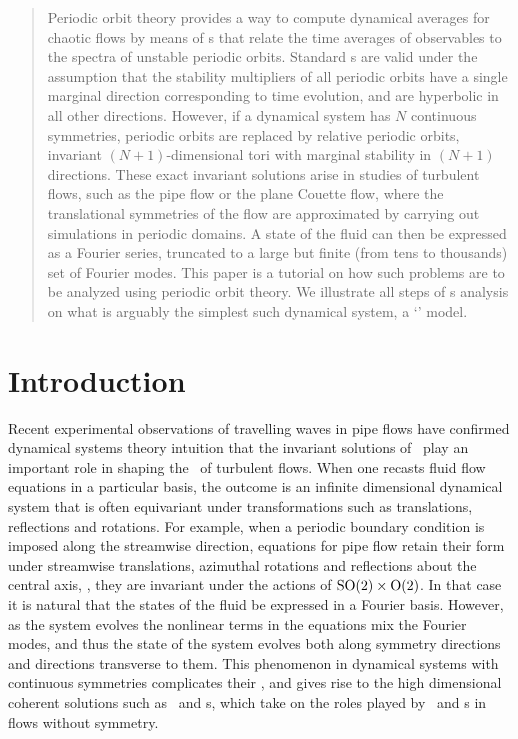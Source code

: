 \documentclass[aip,cha,
reprint,
secnumarabic,
nofootinbib, tightenlines,
nobibnotes, showkeys, showpacs,
superscriptaddress,
]{revtex4-1}
\begin{document}
\begin{quotation}
Periodic orbit theory provides a way to compute dynamical averages for
chaotic flows by means of {\cycForm s} that relate the time averages of
observables to the spectra of unstable periodic orbits. Standard
{\cycForm s} are valid under the assumption that the stability
multipliers of all periodic orbits have a single marginal direction
corresponding to time evolution, and are hyperbolic in all other
directions. However, if a dynamical system has $N$ continuous symmetries,
periodic orbits are replaced by relative periodic orbits, invariant
$(N+1)$-dimensional tori with marginal stability in $(N+1)$ directions.
These exact invariant solutions arise in studies of turbulent flows, such
as the pipe flow or the plane Couette flow, where the translational
symmetries of the flow are approximated by carrying out simulations in
periodic domains. A state of the fluid can then be expressed as a Fourier
series, truncated to a large but finite (from tens to thousands) set of
Fourier modes. This paper is a tutorial on how such problems are to be
analyzed using periodic orbit theory. We illustrate all steps of
\rpo s analysis on what is arguably the simplest such dynamical system, a
`\twomode' model.
\end{quotation}

\section{Introduction}
\label{s:intro}

Recent experimental observations of travelling waves in pipe flows have
confirmed dynamical systems theory intuition that the invariant solutions
of \NSe\ play an important role in shaping the \statesp\ of turbulent
flows. When one recasts fluid flow equations in a
particular basis, the outcome is an infinite dimensional dynamical system
that is often equivariant under transformations such as
translations, reflections and rotations. For example, when a periodic
boundary condition is imposed along the streamwise direction, equations
for pipe flow retain their form under streamwise translations, azimuthal
rotations and reflections about the central axis, \ie, they are invariant
under the actions of $\textrm{SO}(2) \times \textrm{O}(2)$. In that case it is natural
that the states of the fluid be expressed in a Fourier basis. However,
as the system evolves the nonlinear terms in the equations mix the
Fourier modes, and thus the state of the system evolves both along
symmetry directions and directions transverse to them.
This phenomenon in dynamical systems with continuous symmetries
complicates their \statesp, and gives rise to the high dimensional coherent
solutions such as \reqva\ and \rpo s, which take on the roles played by
\eqva\ and \po s in flows without symmetry.
\end{document}
